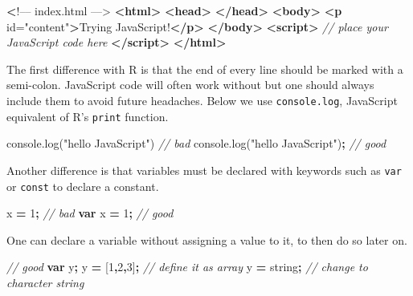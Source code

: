 \documentclass[
]{krantz}
\makeatletter
\newenvironment{Shaded}{\begin{snugshade}}{\end{snugshade}}
\newcommand{\AttributeTok}[1]{\textcolor[rgb]{0.61,0.61,0.61}{#1}}
\newcommand{\CommentTok}[1]{\textcolor[rgb]{0.37,0.37,0.37}{\textit{#1}}}
\newcommand{\DecValTok}[1]{\textcolor[rgb]{0.06,0.06,0.06}{#1}}
\newcommand{\ErrorTok}[1]{\textcolor[rgb]{0.14,0.14,0.14}{\textbf{#1}}}
\newcommand{\KeywordTok}[1]{\textcolor[rgb]{0.27,0.27,0.27}{\textbf{#1}}}
\newcommand{\NormalTok}[1]{#1}
\newcommand{\OperatorTok}[1]{\textcolor[rgb]{0.43,0.43,0.43}{\textbf{#1}}}
\newcommand{\OtherTok}[1]{\textcolor[rgb]{0.37,0.37,0.37}{#1}}
\newcommand{\StringTok}[1]{\textcolor[rgb]{0.5,0.5,0.5}{#1}}
\newcommand{\VariableTok}[1]{\textcolor[rgb]{0,0,0}{#1}}
\newenvironment{kframe}{%
\medskip{}
\setlength{\fboxsep}{.8em}
 \def\at@end@of@kframe{}%
 \ifinner\ifhmode%
  \def\at@end@of@kframe{\end{minipage}}%
  \begin{minipage}{\columnwidth}%
 \fi\fi%
 \def\FrameCommand##1{\hskip\@totalleftmargin \hskip-\fboxsep
 \colorbox{shadecolor}{##1}\hskip-\fboxsep
     \hskip-\linewidth \hskip-\@totalleftmargin \hskip\columnwidth}%
 \MakeFramed {\advance\hsize-\width
   \@totalleftmargin\z@ \linewidth\hsize
   \@setminipage}}%
 {\par\unskip\endMakeFramed%
 \at@end@of@kframe}
\renewenvironment{Shaded}{\begin{kframe}}{\end{kframe}}
\makeatother
\begin{document}
\begin{Shaded}
\begin{Highlighting}[]
 \ErrorTok{<}\NormalTok{!–– index.html ––>}
\KeywordTok{<html>}
  \KeywordTok{<head>}
  \KeywordTok{</head>}
  \KeywordTok{<body>}
    \KeywordTok{<p}\OtherTok{ id=}\StringTok{"content"}\KeywordTok{>}\NormalTok{Trying JavaScript!}\KeywordTok{</p>}
  \KeywordTok{</body>}
  \KeywordTok{<script>}
    \CommentTok{// place your JavaScript code here}
  \KeywordTok{</script>}
\KeywordTok{</html>}
\end{Highlighting}
\end{Shaded}

The first difference with R is that the end of every line should be marked with a semi-colon. JavaScript code will often work without but one should always include them to avoid future headaches. Below we use \texttt{console.log}, JavaScript equivalent of R's \texttt{print} function.

\begin{Shaded}
\begin{Highlighting}[]
\VariableTok{console}\NormalTok{.}\AttributeTok{log}\NormalTok{(}\StringTok{"hello JavaScript"}\NormalTok{) }\CommentTok{// bad}
\VariableTok{console}\NormalTok{.}\AttributeTok{log}\NormalTok{(}\StringTok{"hello JavaScript"}\NormalTok{)}\OperatorTok{;} \CommentTok{// good}
\end{Highlighting}
\end{Shaded}

Another difference is that variables must be declared with keywords such as \texttt{var} or \texttt{const} to declare a constant.

\begin{Shaded}
\begin{Highlighting}[]
\NormalTok{x }\OperatorTok{=} \DecValTok{1}\OperatorTok{;} \CommentTok{// bad}
\KeywordTok{var}\NormalTok{ x }\OperatorTok{=} \DecValTok{1}\OperatorTok{;} \CommentTok{// good}
\end{Highlighting}
\end{Shaded}

One can declare a variable without assigning a value to it, to then do so later on.

\begin{Shaded}
\begin{Highlighting}[]
\CommentTok{// good}
\KeywordTok{var}\NormalTok{ y}\OperatorTok{;} 
\NormalTok{y }\OperatorTok{=}\NormalTok{ [}\DecValTok{1}\OperatorTok{,}\DecValTok{2}\OperatorTok{,}\DecValTok{3}\NormalTok{]}\OperatorTok{;} \CommentTok{// define it as array}
\NormalTok{y }\OperatorTok{=} \StringTok{\textquotesingle{}string\textquotesingle{}}\OperatorTok{;} \CommentTok{// change to character string}
\end{Highlighting}
\end{Shaded}
\end{document}
